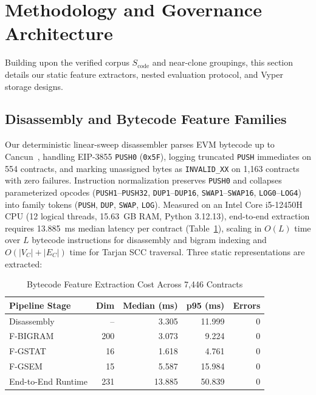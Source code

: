 \documentclass[conference]{IEEEtran}
\begin{document}
\section{Methodology and Governance Architecture}\label{sec:method}

Building upon the verified corpus $S_{\text{code}}$ and near-clone groupings, this section details our static feature extractors, nested evaluation protocol, and Vyper storage designs.

\subsection{Disassembly and Bytecode Feature Families}\label{sec:features}

Our deterministic linear-sweep disassembler parses EVM bytecode up to Cancun~\cite{wood2014ethereum}, handling EIP-3855 \texttt{PUSH0} (\texttt{0x5F}), logging truncated \texttt{PUSH} immediates on 554 contracts, and marking unassigned bytes as \texttt{INVALID\_XX} on 1,163 contracts with zero failures. Instruction normalization preserves \texttt{PUSH0} and collapses parameterized opcodes (\texttt{PUSH1}--\texttt{PUSH32}, \texttt{DUP1}--\texttt{DUP16}, \texttt{SWAP1}--\texttt{SWAP16}, \texttt{LOG0}--\texttt{LOG4}) into family tokens (\texttt{PUSH}, \texttt{DUP}, \texttt{SWAP}, \texttt{LOG}). Measured on an Intel Core i5-12450H CPU (12 logical threads, 15.63~GB RAM, Python 3.12.13), end-to-end extraction requires 13.885~ms median latency per contract (Table~\ref{tab:extraction_cost}), scaling in $O(L)$ time over $L$ bytecode instructions for disassembly and bigram indexing and $O(|V_C| + |E_C|)$ time for Tarjan SCC traversal. Three static representations are extracted:

\begin{table}[t]
\centering
\caption{Bytecode Feature Extraction Cost Across 7,446 Contracts}
\label{tab:extraction_cost}
\footnotesize
\setlength{\tabcolsep}{4pt}
\begin{tabular}{@{}lrrrr@{}}
\toprule
Pipeline Stage & Dim & Median (ms) & p95 (ms) & Errors \\
\midrule
Disassembly & -- & 3.305 & 11.999 & 0 \\
F-BIGRAM & 200 & 3.073 & 9.224 & 0 \\
F-GSTAT & 16 & 1.618 & 4.761 & 0 \\
F-GSEM & 15 & 5.587 & 15.984 & 0 \\
End-to-End Runtime & 231 & 13.885 & 50.839 & 0 \\
\bottomrule
\end{tabular}
\end{table}
\end{document}
